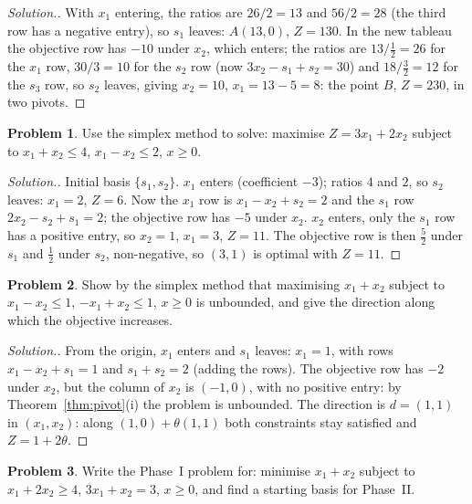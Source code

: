\documentclass[11pt,a4paper]{article}
\numberwithin{equation}{section}
\theoremstyle{definition}
\newtheorem{problemx}{Problem}[subsection]
\newenvironment{problem}{\begin{problemx}}{\end{problemx}}
\newenvironment{solution}
  {\renewcommand{\qedsymbol}{}\begin{proof}[\textit{Solution}.]}
  {\end{proof}}
\begin{document}
\begin{solution}
With $x_1$ entering, the ratios are $26/2 = 13$ and $56/2 = 28$ (the third row has a negative entry), so $s_1$ leaves: $A(13, 0)$, $Z = 130$. In the new tableau the objective row has $-10$ under $x_2$, which enters; the ratios are $13/\frac12 = 26$ for the $x_1$ row, $30/3 = 10$ for the $s_2$ row (now
$3x_2 - s_1 + s_2 = 30$) and $18/\frac32 = 12$ for the $s_3$ row, so $s_2$ leaves, giving $x_2 = 10$, $x_1 = 13 - 5 = 8$: the point $B$, $Z = 230$, in two pivots.
\end{solution}

\begin{problem}
Use the simplex method to solve: maximise $Z = 3x_1 + 2x_2$ subject to $x_1 + x_2 \leq 4$, $x_1 - x_2 \leq 2$, $x \geq 0$.
\end{problem}

\begin{solution}
Initial basis $\{s_1, s_2\}$. $x_1$ enters (coefficient $-3$); ratios $4$ and $2$, so $s_2$ leaves: $x_1 = 2$, $Z = 6$. Now the $x_1$ row is $x_1 - x_2 + s_2 = 2$ and the $s_1$ row $2x_2 - s_2 + s_1 = 2$; the objective row has $-5$ under $x_2$. $x_2$ enters, only the $s_1$ row has a positive
entry, so $x_2 = 1$, $x_1 = 3$, $Z = 11$. The objective row is then $\frac52$ under $s_1$ and $\frac12$ under $s_2$, non-negative, so $(3, 1)$ is optimal with $Z = 11$.
\end{solution}

\begin{problem}
Show by the simplex method that maximising $x_1 + x_2$ subject to $x_1 - x_2 \leq 1$, $-x_1 + x_2 \leq 1$, $x \geq 0$ is unbounded, and give the direction along which the objective increases.
\end{problem}

\begin{solution}
From the origin, $x_1$ enters and $s_1$ leaves: $x_1 = 1$, with rows $x_1 - x_2 + s_1 = 1$ and $s_1 + s_2 = 2$ (adding the rows). The objective row has $-2$ under $x_2$, but the column of $x_2$ is $(-1, 0)$, with no positive entry: by Theorem~\ref{thm:pivot}(i) the problem is unbounded. The direction is
$d = (1, 1)$ in $(x_1, x_2)$: along $(1, 0) + \theta(1, 1)$ both constraints stay satisfied and $Z = 1 + 2\theta$.
\end{solution}

\begin{problem}
Write the Phase~I problem for: minimise $x_1 + x_2$ subject to $x_1 + 2x_2 \geq 4$, $3x_1 + x_2 = 3$, $x \geq 0$, and find a starting basis for Phase~II.
\end{problem}
\end{document}
